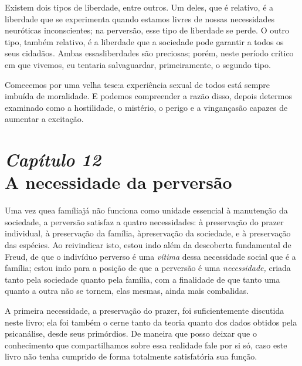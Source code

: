Existem dois tipos de liberdade, entre outros. Um deles, que é
relativo, é a liberdade que se experimenta quando estamos livres de
nossas necessidades neuróticas inconscientes; na perversão, esse tipo
de liberdade se perde. O outro tipo, também relativo, é a liberdade que
a sociedade pode garantir a todos os seus cidadãos. Ambas essas\idxsexulrep[|)]
liberdades são preciosas; porém, neste período crítico em que vivemos,
eu tentaria salvaguardar, primeiramente, o segundo tipo.\idxsexul[|)]

Comecemos por uma velha tese:\idxsexulres[|)] a experiência sexual de todos está sempre
imbuída de moralidade. E podemos compreender a razão disso, depois de\idxpervdirei[|)]
termos examinado como a hostilidade, o mistério, o perigo e a vingança\idxpecad[|)]
são capazes de aumentar a excitação.



\chapter[\textbf{12}\quad A necessidade da perversão]{{\large\textit{Capítulo 12}}\\ A necessidade da perversão}


Uma vez que\idxpervneces[|(] a família\idxinflu[|(] já não funciona como unidade essencial à
manutenção da sociedade, a perversão satisfaz a quatro necessidades: à
preservação do prazer individual, à preservação da família, à\idxrelpc[|(]
preservação da sociedade, e à preservação das espécies. Ao reivindicar
isto, estou indo além da descoberta fundamental de Freud,\idxfreudperve{} de que o
indivíduo perverso é uma \textit{vítima} dessa necessidade social que é
a família; estou indo para a posição de que a perversão é uma\textit{
necessidade,} criada tanto pela sociedade quanto pela família, com a
finalidade de que tanto uma quanto a outra não se tornem, elas mesmas,
ainda mais combalidas.

A primeira necessidade, a preservação do prazer, foi suficientemente
discutida neste livro; ela foi também o cerne tanto da teoria quanto
dos dados obtidos pela psicanálise, desde seus primórdios. De maneira
que posso deixar que o conhecimento que compartilhamos sobre essa
realidade fale por si só, caso este livro não tenha cumprido de forma
totalmente satisfatória sua função.

